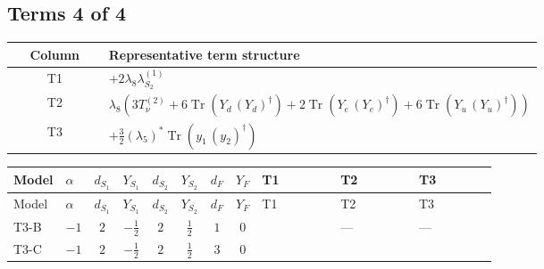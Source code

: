 \documentclass[8pt]{article}
\begin{document}
\begin{landscape}
\subsection*{Terms 4 of 4}
\begin{center}
\begin{tabular}{@{}c >{\raggedright\arraybackslash}p{0.82\linewidth}@{}}
\toprule
Column & Representative term structure \\
\midrule
T1 & \(\displaystyle +2 {\lambda_8} {\lambda_{S_2}^{(1)}}\) \\
\midrule
T2 & \(\displaystyle {\lambda_8} (3 T_{\nu}^{(2)}+6 \operatorname{Tr}\!\left({Y_d}\,\left({Y_d}\right)^{\dagger}\right)+2 \operatorname{Tr}\!\left({Y_e}\,\left({Y_e}\right)^{\dagger}\right)+6 \operatorname{Tr}\!\left({Y_u}\,\left({Y_u}\right)^{\dagger}\right))\) \\
\midrule
T3 & \(\displaystyle +\frac{3}{2} \left({\lambda_5}\right)^{*} \operatorname{Tr}\!\left({y_1}\,\left({y_2}\right)^{\dagger}\right)\) \\
\midrule
\bottomrule
\end{tabular}
\end{center}
\smallskip
\tiny
\begin{longtable}{@{}llcccccc >{\raggedright\arraybackslash}p{0.21\linewidth} >{\raggedright\arraybackslash}p{0.21\linewidth} >{\raggedright\arraybackslash}p{0.21\linewidth}@{}}
\toprule
Model & $\alpha$ & $d_{S_1}$ & $Y_{S_1}$ & $d_{S_2}$ & $Y_{S_2}$ & $d_F$ & $Y_F$ & T1 & T2 & T3 \\
\midrule
\endfirsthead
\toprule
Model & $\alpha$ & $d_{S_1}$ & $Y_{S_1}$ & $d_{S_2}$ & $Y_{S_2}$ & $d_F$ & $Y_F$ & T1 & T2 & T3 \\
\midrule
\endhead
T3-B & $-1$ & $2$ & $-\frac{1}{2}$ & $2$ & $\frac{1}{2}$ & $1$ & $0$ & \scriptsize\adjustbox{max width=\linewidth}{$\begin{gathered} +2 {\lambda_8} {\lambda_{S_2}^{(1)}}\end{gathered}$} & --- & --- \\
\midrule
T3-C & $-1$ & $2$ & $-\frac{1}{2}$ & $2$ & $\frac{1}{2}$ & $3$ & $0$ & \scriptsize\adjustbox{max width=\linewidth}{$\begin{gathered} +2 {\lambda_8} {\lambda_{S_2}^{(1)}}\end{gathered}$} & \scriptsize\adjustbox{max width=\linewidth}{$\begin{gathered} {\lambda_8} (3 T_{\nu}^{(2)}+6 \operatorname{Tr}\!\left({Y_d}\,\left({Y_d}\right)^{\dagger}\right)+2 \operatorname{Tr}\!\left({Y_e}\,\left({Y_e}\right)^{\dagger}\right)+6 \operatorname{Tr}\!\left({Y_u}\,\left({Y_u}\right)^{\dagger}\right))\end{gathered}$} & \scriptsize\adjustbox{max width=\linewidth}{$\begin{gathered} +\frac{3}{2} \left({\lambda_5}\right)^{*} \operatorname{Tr}\!\left({y_1}\,\left({y_2}\right)^{\dagger}\right)\end{gathered}$} \\

\end{longtable}
\end{landscape}
\end{document}
